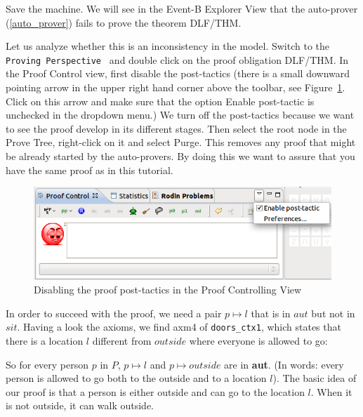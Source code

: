 Save the machine. We will see in the Event-B Explorer View that the auto-prover (\ref{auto_prover}) fails to prove the theorem \textsf{DLF/THM}.


Let us analyze whether this is an inconsistency in the model. Switch to the \texttt{Proving Perspective } and double click on the proof obligation \textsf{DLF/THM}.
In the Proof Control view, first disable the post-tactics (there is a small downward pointing arrow in the upper right hand corner above the toolbar, see Figure~\ref{fig_tut_10_post_tactics}.
Click on this arrow and make sure that the option \textsf{Enable post-tactic} is unchecked in the dropdown menu.)
We turn off the post-tactics because we want to see the proof develop in its different stages.
Then select the root node in the \textsf{Prove Tree}, right-click on it and select \textsf{Purge}.
This removes any proof that might be already started by the auto-provers.
By doing this we want to assure that you have the same proof as in this tutorial.

\begin{figure}[!ht]
  \begin{center}
    	\includegraphics{img/tutorial/tut_10_post_tactics.png}
    \caption{Disabling the proof post-tactics in the Proof Controlling View}
    \label{fig_tut_10_post_tactics}
  \end{center}
\end{figure}

In order to succeed with the proof, we need a pair $p \mapsto l$ that is in $aut$ but not in $sit$.
Having a look the axioms, we find  \textsf{axm4} of \texttt{doors\_ctx1}, which states that 
  there is a location $l$ different from $outside$ where everyone is allowed to go:
\begin{description}
\AXIOMS
	\begin{description}
	\end{description}
\end{description}
So for every person $p$ in $P$, $p \mapsto l$ and $p \mapsto outside$ are in \textbf{aut}.
(In words: every person is allowed to go both to the outside and to a location $l$).
The basic idea of our proof is that a person is either outside and can go to the location $l$.
When it is not outside, it can walk outside.

